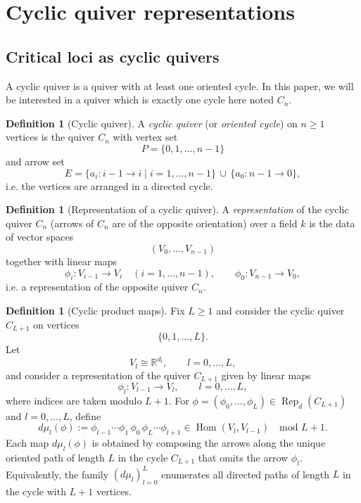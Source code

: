 \documentclass{article}
\newcommand{\Hom}{\operatorname{Hom}}
\newcommand{\Rep}{\operatorname{Rep}}
\theoremstyle{definition}
\newtheorem{definition}[theorem]{Definition}
\begin{document}
\section{Cyclic quiver representations}
\subsection{Critical loci as cyclic quivers}
A cyclic quiver is a quiver with at least one oriented cycle. In this paper, we will be interested in a quiver which is exactly one cycle here noted $C_n$.
\begin{definition}[Cyclic quiver]\label{def:cyclic-quiver}
A \emph{cyclic quiver} (or \emph{oriented cycle}) on $n\ge 1$ vertices is the quiver
$C_n$ with vertex set
\[
    P=\{0,1,\ldots,n-1\}
\]
and arrow set
\[
    E=\{a_{i}: i-1\to i\mid i=1,\ldots,n-1\}\,\cup\,\{a_{0}: n-1\to 0\},
\]
i.e. the vertices are arranged in a directed cycle.
\end{definition}

\begin{definition}[Representation of a cyclic quiver]\label{def:cyclic-quiver-representation}
A \emph{representation} of the cyclic quiver $C_n$ (arrows of $C_n$ are of the opposite orientation) over a field $k$ is the data of
vector spaces
\[
    (V_0,\ldots,V_{n-1})
\]
together with linear maps
\[
    \phi_{i}: V_{i-1}\to V_{i} \quad (i=1,\ldots,n-1),
    \qquad
    \phi_{0}: V_{n-1}\to V_{0},
\]
i.e. a representation of the opposite quiver $C_n$.
\end{definition}
\begin{definition}[Cyclic product maps]\label{def:cyclic-product}
Fix $L\ge 1$ and consider the cyclic quiver $C_{L+1}$ on vertices
\[
\{0,1,\ldots,L\}.
\]
Let
\[
V_l \cong \mathbb{R}^{d_l}, \qquad l=0,\ldots,L,
\]
and consider a representation of the quiver $C_{L+1}$ given by linear maps
\[
\phi_l:V_{l-1}\to V_l, \qquad l=0,\ldots,L,
\]
where indices are taken modulo $L+1$.
\noindent
For $\phi=(\phi_0,\ldots,\phi_L)\in \Rep_d(C_{L+1})$ and $l=0,\ldots,L$, define
\[
d\mu_l(\phi)
:=
\phi_{l-1}\cdots\phi_1\,
\phi_0\,
\phi_L\cdots\phi_{l+1}
\in \Hom(V_l,V_{l-1})
\quad \text{mod } L+1.
\]
\noindent
Each map $d\mu_l(\phi)$ is obtained by composing the arrows along the
unique oriented path of length $L$ in the cycle $C_{L+1}$ that omits the arrow $\phi_l$.
Equivalently, the family $(d\mu_l)_{l=0}^{L}$ enumerates all directed paths of length $L$
in the cycle with $L+1$ vertices.
\end{definition}
\end{document}
